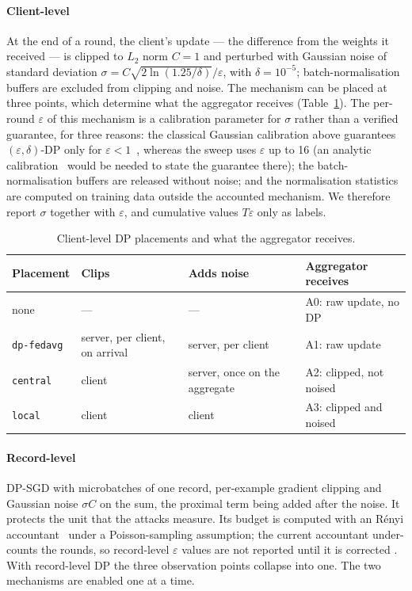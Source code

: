 \paragraph{Client-level} At the end of a round, the client's update --- the
difference from the weights it received --- is clipped to $L_2$ norm $C = 1$
and perturbed with Gaussian noise of standard deviation
$\sigma = C\sqrt{2\ln(1.25/\delta)}/\varepsilon$, with $\delta = 10^{-5}$;
batch-normalisation buffers are excluded from clipping and noise. The
mechanism can be placed at three points, which determine what the aggregator
receives (Table~\ref{tab:placements}). The per-round $\varepsilon$ of this
mechanism is a calibration parameter for $\sigma$ rather than a verified
guarantee, for three reasons: the classical Gaussian calibration above
guarantees $(\varepsilon,\delta)$-DP only for $\varepsilon <
1$~\cite[Thm.~A.1]{dwork2014algorithmic}, whereas the sweep uses $\varepsilon$
up to 16 (an analytic calibration~\cite{balle2018improving} would be needed to
state the guarantee there); the batch-normalisation buffers are released
without noise; and the normalisation statistics are computed on training data
outside the accounted mechanism. We therefore report $\sigma$ together with
$\varepsilon$, and cumulative values $T\varepsilon$ only as labels.

\begin{table}[t]
\centering
\caption{Client-level DP placements and what the aggregator receives.}
\label{tab:placements}
\footnotesize
\begin{tabular}{@{}p{1.45cm}p{1.55cm}p{1.9cm}p{2.25cm}@{}}
\toprule
Placement & Clips & Adds noise & Aggregator receives \\
\midrule
none & --- & --- & A0: raw update, no DP \\
\texttt{dp-fedavg} & server, per client, on arrival & server, per client & A1: raw update \\
\texttt{central} & client & server, once on the aggregate & A2: clipped, not noised \\
\texttt{local} & client & client & A3: clipped and noised \\
\bottomrule
\end{tabular}
\end{table}

\paragraph{Record-level} DP-SGD with microbatches of one record, per-example
gradient clipping and Gaussian noise $\sigma C$ on the sum, the proximal term
being added after the noise. It protects the unit that the attacks measure.
Its budget is computed with an R\'enyi accountant~\cite{mironov2017renyi}
under a Poisson-sampling assumption; the current accountant under-counts the
rounds, so record-level $\varepsilon$ values are not reported until it is
corrected . With record-level DP the three observation
points collapse into one. The two mechanisms are enabled one at a time.

